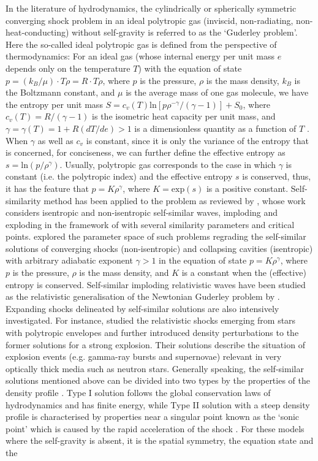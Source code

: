 \documentclass[fleqn,usenatbib]{mnras}
\begin{document}
In the literature of hydrodynamics, the cylindrically or spherically symmetric converging shock problem in an ideal polytropic gas (inviscid, non-radiating, non-heat-conducting) without self-gravity is referred to as the `Guderley problem'. Here the so-called ideal polytropic gas is defined from the perspective of thermodynamics: For an ideal gas (whose internal energy per unit mass $e$ depends only on the temperature $T$) with the equation of state $p=\left(k_{B}/\mu\right)\cdot T\rho=R\cdot T\rho$, where $p$ is the pressure, $\rho$ is the mass density, $k_{B}$ is the Boltzmann constant, and $\mu$ is the average mass of one gas molecule, we have the entropy per unit mass $S=c_{v}(T)\mathrm{ln}\left[ p\rho^{-\gamma}/\left(\gamma-1\right)\right]+S_{0}$, where $c_{v}(T)=R/\left(\gamma-1\right)$ is the isometric heat capacity per unit mass, and $\gamma=\gamma(T)=1+R\left(dT/de\right)>1$ is a dimensionless quantity as a function of $T$ \citep{SFSW}. When $\gamma$ as well as $c_{v}$ is constant, since it is only the variance of the entropy that is concerned, for conciseness, we can further define the effective entropy as $s=\mathrm{ln}\left(p/\rho^{\gamma}\right)$. Usually, polytropic gas corresponds to the case in which $\gamma$ is constant (i.e. the polytropic index) and the effective entropy $s$ is conserved, thus, it has the feature that $p=K\rho^{\gamma}$, where $K=\mathrm{exp}(s)$ is a positive constant. Self-similarity method has been applied to the problem as reviewed by \citet{meyer1982selfsimilar}, whose work considers isentropic and non-isentropic self-similar waves, imploding and exploding in the framework of \citet{guderley1942powerful} with several similarity parameters and critical points. \citet{lazarus1981self} explored the parameter space of such problems regrading the self-similar solutions of converging shocks (non-isentropic) and collapsing cavities (isentropic) with arbitrary adiabatic exponent $\gamma>1$ in the equation of state $p=K\rho^{\gamma}$, where $p$ is the pressure, $\rho$ is the mass density, and $K$ is a constant when the (effective) entropy is conserved. Self-similar imploding relativistic waves have been studied as the relativistic generalisation of the Newtonian Guderley problem  by \citet{hidalgo2005self}. Expanding shocks delineated by self-similar solutions are also intensively investigated. For instance, \citet{pan2006self} studied the relativistic shocks emerging from stars with polytropic envelopes and \citet{oren2009discrete} further introduced density perturbations to the former solutions for a strong explosion. Their solutions describe the situation of explosion events (e.g. gamma-ray bursts and supernovae) relevant in very optically thick media such as neutron stars. Generally speaking, the self-similar solutions mentioned above can be divided into two types by the properties of the density profile \citep{oren2009discrete}. Type I solution follows the global conservation laws of hydrodynamics and has finite energy, while Type II solution with a steep density profile is characterised by properties near a singular point known as the `sonic point' which is caused by the rapid acceleration of the shock \citep{pan2006self}. For these models where the self-gravity is absent, it is the spatial symmetry, the equation state and the 
\end{document}
